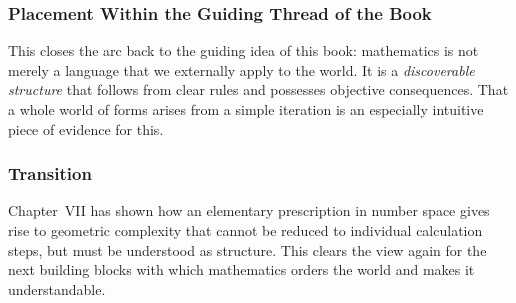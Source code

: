 \subsubsection*{Placement Within the Guiding Thread of the Book}

This closes the arc back to the guiding idea of this book:
mathematics is not merely a language
that we externally apply to the world.
It is a \emph{discoverable structure}
that follows from clear rules
and possesses objective consequences.
That a whole world of forms arises
from a simple iteration
is an especially intuitive piece of evidence for this.

\subsubsection*{Transition}

Chapter~VII has shown
how an elementary prescription in number space
gives rise to geometric complexity
that cannot be reduced to individual calculation steps,
but must be understood as structure.
This clears the view again
for the next building blocks
with which mathematics orders the world
and makes it understandable.